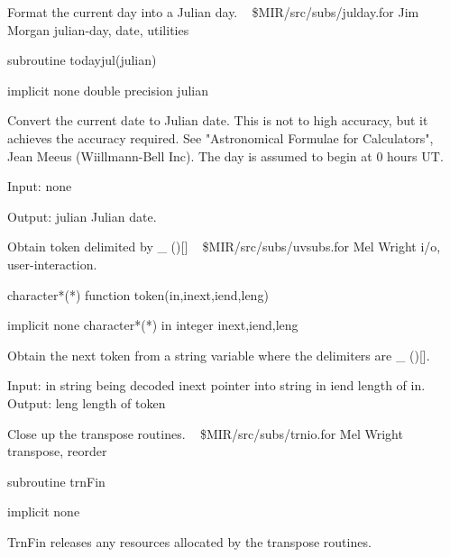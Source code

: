 %
\noindent Format the current day into a Julian day.
\newline \ 
\newline {} \$MIR/src/subs/julday.for
\newline {} Jim Morgan
\newline {} julian-day, date, utilities
\par{\tenpoint
{\eightpoint\begintt
      subroutine todayjul(julian)

      implicit none
      double precision julian

  Convert the current date to Julian date.  This is not to high
  accuracy, but it achieves the accuracy required. See "Astronomical
  Formulae for Calculators", Jean Meeus (Wiillmann-Bell Inc).
  The day is assumed to begin at 0 hours UT.

  Input:
    none

  Output:
    julian      Julian date.
\endtt}
\par}
%
\noindent Obtain token delimited by \_ ()[]
\newline \ 
\newline {} \$MIR/src/subs/uvsubs.for
\newline {} Mel Wright
\newline \abox{Keywords:} i/o, user-interaction.
\par{\tenpoint
{\eightpoint\begintt
        character*(*) function token(in,inext,iend,leng)

        implicit none
        character*(*) in
        integer inext,iend,leng

  Obtain the next token from a string variable where the delimiters
       are _ ()[].

  Input:
    in         string being decoded
    inext      pointer into string in
    iend       length of in.
  Output:
    leng       length of token
\endtt}
\par}
%
\noindent Close up the transpose routines.
\newline \ 
\newline {} \$MIR/src/subs/trnio.for
\newline \abox{Responsible:} Mel Wright
\newline {} transpose, reorder
\par{\tenpoint
{\eightpoint\begintt
        subroutine trnFin

        implicit none

  TrnFin releases any resources allocated by the transpose routines.
\endtt}
\par}

